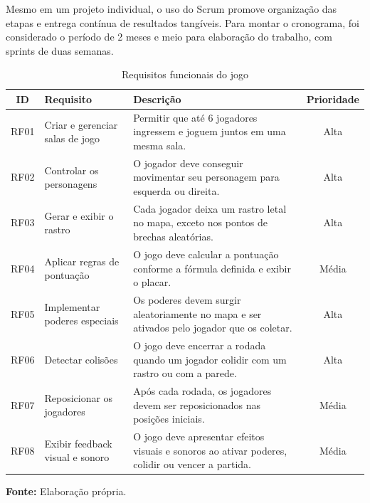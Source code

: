 Mesmo em um projeto individual, o uso do Scrum promove organização das etapas e entrega contínua de resultados tangíveis. Para montar o cronograma, foi considerado o período de 2 meses e meio para elaboração do trabalho, com sprints de duas semanas.

\begin{table}[H]
\centering
\caption{Requisitos funcionais do jogo}
\label{tab:requisitos}
\begin{tabular}{|c|p{3cm}|p{7.5cm}|c|}
\hline
\textbf{ID} & \textbf{Requisito} & \textbf{Descrição} & \textbf{Prioridade} \\ \hline
RF01 & Criar e gerenciar salas de jogo & Permitir que até 6 jogadores ingressem e joguem juntos em uma mesma sala. & Alta \\ \hline
RF02 & Controlar os personagens & O jogador deve conseguir movimentar seu personagem para esquerda ou direita. & Alta \\ \hline
RF03 & Gerar e exibir o rastro & Cada jogador deixa um rastro letal no mapa, exceto nos pontos de brechas aleatórias. & Alta \\ \hline
RF04 & Aplicar regras de pontuação & O jogo deve calcular a pontuação conforme a fórmula definida e exibir o placar. & Média \\ \hline
RF05 & Implementar poderes especiais & Os poderes devem surgir aleatoriamente no mapa e ser ativados pelo jogador que os coletar. & Alta \\ \hline
RF06 & Detectar colisões & O jogo deve encerrar a rodada quando um jogador colidir com um rastro ou com a parede. & Alta \\ \hline
RF07 & Reposicionar os jogadores & Após cada rodada, os jogadores devem ser reposicionados nas posições iniciais. & Média \\ \hline
RF08 & Exibir feedback visual e sonoro & O jogo deve apresentar efeitos visuais e sonoros ao ativar poderes, colidir ou vencer a partida. & Média \\ \hline
\end{tabular}

\vspace{0.3em}
\small \textbf{Fonte:} Elaboração própria.
\end{table}

